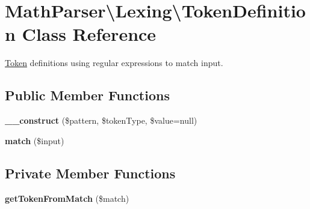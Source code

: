 \hypertarget{classMathParser_1_1Lexing_1_1TokenDefinition}{\section{Math\-Parser\textbackslash{}Lexing\textbackslash{}Token\-Definition Class Reference}
\label{classMathParser_1_1Lexing_1_1TokenDefinition}
}


\hyperlink{classMathParser_1_1Lexing_1_1Token}{Token} definitions using regular expressions to match input.  


\subsection*{Public Member Functions}
\begin{DoxyCompactItemize}
\item 
\hypertarget{classMathParser_1_1Lexing_1_1TokenDefinition_a1e303313d24845e715750416ac6f829a}{{\bfseries \-\_\-\-\_\-construct} (\$pattern, \$token\-Type, \$value=null)}\label{classMathParser_1_1Lexing_1_1TokenDefinition_a1e303313d24845e715750416ac6f829a}

\item 
\hypertarget{classMathParser_1_1Lexing_1_1TokenDefinition_a6fbea2374195a9ede9bc01c097af16ec}{{\bfseries match} (\$input)}\label{classMathParser_1_1Lexing_1_1TokenDefinition_a6fbea2374195a9ede9bc01c097af16ec}

\end{DoxyCompactItemize}
\subsection*{Private Member Functions}
\begin{DoxyCompactItemize}
\item 
\hypertarget{classMathParser_1_1Lexing_1_1TokenDefinition_a2f4ffbafe4f5f613ac52e02b31822d7c}{{\bfseries get\-Token\-From\-Match} (\$match)}\label{classMathParser_1_1Lexing_1_1TokenDefinition_a2f4ffbafe4f5f613ac52e02b31822d7c}

\end{DoxyCompactItemize}
